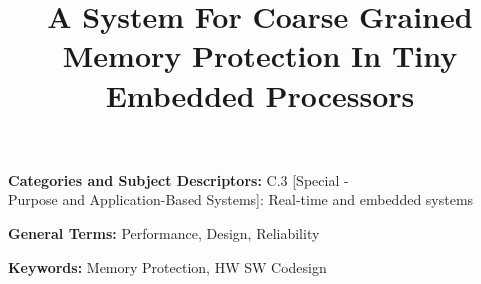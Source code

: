 \documentclass{sig-alternate}
\begin{document}
\date{}

\title{A System For Coarse Grained Memory Protection In Tiny Embedded Processors}


\maketitle
\thispagestyle{empty}


\begin{abstract}

\end{abstract}
%

\vspace{1mm}
\noindent
{\bf Categories and Subject Descriptors:} C.3 {[Special - \\Purpose and Application-Based Systems]}: {Real-time and embedded systems}

\vspace{1mm}
\noindent
{\bf General Terms:} Performance, Design, Reliability

\vspace{1mm}
\noindent
{\bf Keywords:} Memory Protection, HW SW Codesign











\end{document}

